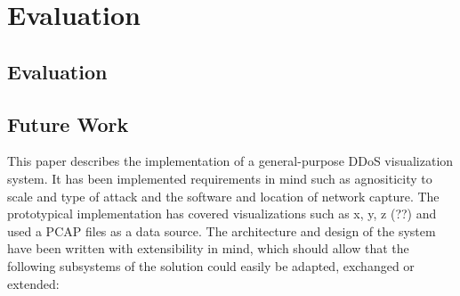 \chapter{Evaluation}

\section{Evaluation}
\section{Future Work}
This paper describes the implementation of a general-purpose DDoS visualization system. It has been implemented requirements in mind such as agnositicity to scale and type of attack and the software and location of network capture.
The prototypical implementation has covered visualizations such as x, y, z (??) and used a PCAP files as a data source.
The architecture and design of the system have been written with extensibility in mind, which should allow that the following subsystems of the solution could easily be adapted, exchanged or extended:
